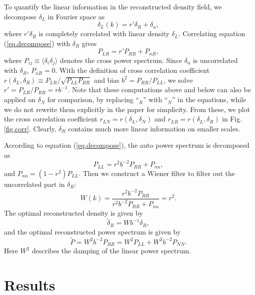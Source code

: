 \documentclass[aps,prd,twocolumn,superscriptaddress,amsfont,amssymb,amsmath,nofootinbib,showpacs,balancelastpage]{revtex4-1}
\begin{document}
To quantify the linear information in the reconstructed density field, we decompose $\delta_L$ in Fourier space as
\begin{equation}\label{eq.decompose}
    \delta_L(k)=r'\delta_R+\delta_n,
\end{equation}
where $r'\delta_R$ is completely correlated with linear density $\delta_L$. Correlating equation (\ref{eq.decompose}) with $\delta_R$ gives
\begin{equation}
    P_{LR}=r'P_{RR}+P_{nR},
\end{equation}
where $P_{ij}\equiv\langle\delta_i\delta_j\rangle$ denotes the cross power 
spectrum. Since $\delta_n$ is uncorrelated with $\delta_R$, $P_{nR}=0$. With the 
definition of cross correlation coefficient $r(\delta_L,\delta_R)\equiv P_{LR}/\sqrt{P_{LL}P_{RR}}$ 
and bias $b^2=P_{RR}/P_{LL}$, we solve $r'=P_{LR}/P_{RR}=rb^{-1}$.
Note that these computations above and below can also be applied on $\delta_N$ for
comparison, by replacing ``$_R$'' with ``$_N$'' in the equations,
while we do not rewrite them explicitly
in the paper for simplicity. From these, we plot the cross 
correlation coefficient $r_{LN}=r(\delta_L,\delta_N)$ and
$r_{LR}=r(\delta_L,\delta_R)$ in Fig.\ref{fig.corr}. Clearly, $
\delta_R$ contains much more linear information on smaller scales.

According to equation (\ref{eq.decompose}), the auto power spectrum is decomposed as
\begin{equation}\label{eq.power}
    P_{LL}=r^2b^{-2}P_{RR}+P_{nn},
\end{equation}
and $P_{nn}=(1-r^2)P_{LL}$. Then we construct a Wiener filter to filter out the uncorrelated part in $\delta_R$:
\begin{equation}
    W(k)=\frac{r^2b^{-2}P_{RR}}{r^2b^{-2}P_{RR}+P_{nn}}=r^2.
\end{equation}
The optimal reconstructed density is given by
\begin{equation}
    \tilde\delta_R=Wb^{-1}\delta_R,
\end{equation}
and the optimal reconstructed power spectrum is given by
\begin{equation}\label{eq.opt}
    \tilde P=W^2b^{-2}P_{RR}=W^2P_{LL}+W^2b^{-2}P_{NN}.
\end{equation}
Here $W^2$ describes the damping of the linear power spectrum.

\section{Results}\label{sec.results}
\end{document}
